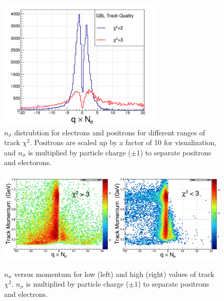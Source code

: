 \documentclass[amsmath,amssymb,notitlepage,12pt]{revtex4-1}
\begin{document}
\begin{figure}[htbp]\centering
    \includegraphics[width=0.7\textwidth]{pics/qnsx2}
    \caption{$n_\sigma$ distrubtion for electrons and positrons for different ranges of track $\chi^2$.  Positrons are scaled up by a factor of 10 for visualization, and $n_\sigma$ is multiplied by particle charge ($\pm1$) to separate positrons and electorons.\label{fig:nsigma}}
\end{figure}

\begin{figure}[htbp]\centering
    \includegraphics[width=0.49\textwidth]{pics/qnspx2lo}
    \includegraphics[width=0.49\textwidth]{pics/qnspx2hi}
    \caption{$n_\sigma$ versus momentum for low (left) and high (right) values of track $\chi^2$.  $n_\sigma$ is multiplied by particle charge ($\pm1$) to separate positrons and electrons.\label{fig:nsigmap}}
\end{figure}
\end{document}
